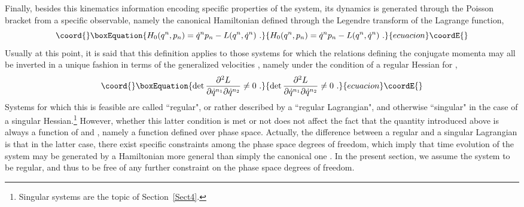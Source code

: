 \documentclass[a4paper,11pt]{article}
\begin{document}
Finally, besides this kinematics information encoding specific
properties of the system, its dynamics is generated through the Poisson
bracket from a specific observable, namely the canonical Hamiltonian defined
through the Legendre transform of the Lagrange function,
\begin{equation}\coord{}\boxEquation{
H_0(q^n,p_n)=\dot{q}^np_n-L(q^n,\dot{q}^n)\ .
}{
H_0(q^n,p_n)=\dot{q}^np_n-L(q^n,\dot{q}^n)\ .
}{ecuacion}\coordE{}\end{equation}
Usually at this point, it is said that this definition applies to
those systems for which the relations \coordHE{} defining
the conjugate momenta may all be inverted in a unique fashion in
terms of the generalized velocities \coordHE{}, namely
under the condition of a regular Hessian for \coordHE{},
\begin{equation}\coord{}\boxEquation{
{\rm det}\,\frac{\partial^2 L}{\partial\dot{q}^{n_1}
\partial\dot{q}^{n_2}}\ne 0\ .
\label{eq:regular}
}{
{\rm det}\,\frac{\partial^2 L}{\partial\dot{q}^{n_1}
\partial\dot{q}^{n_2}}\ne 0\ .
}{ecuacion}\coordE{}\end{equation}
Systems for which this is feasible are called ``regular", or rather
described by a ``regular Lagrangian", and otherwise ``singular" in the
case of a singular Hessian.\footnote{Singular systems are the topic of 
Section~\ref{Sect4}.} However, whether this latter condition is met or 
not does not affect the fact that the quantity \coordHE{} introduced above is 
always\cite{JG1} a function of \coordHE{} and \coordHE{}, namely a function defined over 
phase space. Actually, the difference between a regular and a singular 
Lagrangian is that in the latter case, there exist specific constraints 
among the phase space degrees of freedom, which imply that time evolution 
of the system may be generated by a Hamiltonian \coordHE{} more general
than simply the canonical one \coordHE{}. In the present section,
we assume the system to be regular, and thus to be free of any
further constraint on the phase space degrees of freedom.
\end{document}
